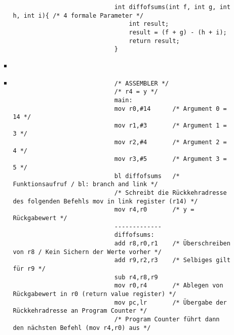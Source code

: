 \begin{itemize}
\begin{itemize}
\begin{itemize}
\begin{verbatim}
                            int diffofsums(int f, int g, int h, int i){ /* 4 formale Parameter */
                                int result;
                                result = (f + g) - (h + i);
                                return result;
                            }
                            \end{verbatim}
                        \item[]
                        \item[]
                            \begin{verbatim}
                            /* ASSEMBLER */
                            /* r4 = y */
                            main:
                            mov r0,#14      /* Argument 0 = 14 */
                            mov r1,#3       /* Argument 1 = 3 */
                            mov r2,#4       /* Argument 2 = 4 */
                            mov r3,#5       /* Argument 3 = 5 */
                            bl diffofsums   /* Funktionsaufruf / bl: branch and link */
                            /* Schreibt die Rückkehradresse des folgenden Befehls mov in link register (r14) */
                            mov r4,r0       /* y = Rückgabewert */
                            -------------
                            diffofsums:
                            add r8,r0,r1    /* Überschreiben von r8 / Kein Sichern der Werte vorher */
                            add r9,r2,r3    /* Selbiges gilt für r9 */
                            sub r4,r8,r9
                            mov r0,r4       /* Ablegen von Rückgabewert in r0 (return value register) */
                            mov pc,lr       /* Übergabe der Rückkehradresse an Program Counter */
                            /* Program Counter führt dann den nächsten Befehl (mov r4,r0) aus */
                            \end{verbatim}
                    \end{itemize}
            \end{itemize}
    \end{itemize}
        


